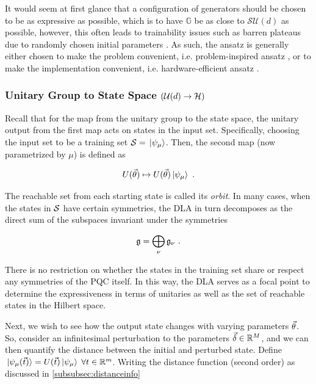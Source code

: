 It would seem at first glance that a configuration of generators should be
chosen to be as expressive as possible, which is to have \(\mathbb{G}\) be as
close to \(\mathcal{SU}(d)\) as possible, however, this often leads to
trainability issues such as barren plateaus due to randomly chosen initial
parameters \cite{larocca2021diagnosing,holmes2021connecting,mcclean2018barren}.
As such, the ansatz is generally either chosen to make the problem convenient,
i.e. problem-inspired ansatz \cite{choquette2021quantum}, or to make the
implementation convenient, i.e. hardware-efficient ansatz
\cite{benedetti2021hardware}.

\subsubsection{Unitary Group to State Space \((\mathcal{U}(d) \to
\mathcal{H})\)} 

Recall that for the map from the unitary group to the state space, the unitary
output from the first map acts on states in the input set. Specifically,
choosing the input set to be a training set \(\mathcal{S} = \ket*{\psi_\mu}\).
Then, the second map (now parametrized by \(\mu\)) is defined as

\begin{equation}
    U(\vec{\theta}) \mapsto U(\vec{\theta})\ket*{\psi_\mu}~.
\end{equation}

The reachable set from each starting state is called its \emph{orbit}. In many
cases, when the states in \(\mathcal{S}\) have certain symmetries, the DLA in turn
decomposes as the direct sum of the subspaces invariant under the symmetries

\begin{equation}
    \mathfrak{g} = \bigoplus_\nu \mathfrak{g}_\nu~.
\end{equation}

There is no restriction on whether the states in the training set share or
respect any symmetries of the PQC itself. In this way, the DLA serves as a focal
point to determine the expressiveness in terms of unitaries as well as the set
of reachable states in the Hilbert space.

Next, we wish to see how the output state changes with varying parameters
\(\vec{\theta}\). So, consider an infinitesimal perturbation to the parameters
\(\vec{\delta} \in \mathbb{R}^M\), and we can then quantify the distance between the
initial and perturbed state. Define \(\ket*{\psi_\mu(\vec{t})} =
U(\vec{t})\ket*{\psi_\mu}\;\forall t \in \mathbb{R}^m\). Writing the distance
function (second order) as discussed in \autoref{subsubsec:distanceinfo}

